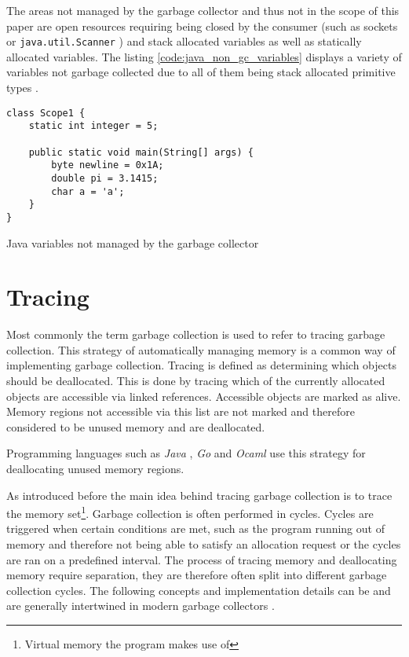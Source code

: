 The areas not managed by the garbage collector and thus not in the scope of
this paper are open resources requiring being closed by the consumer (such as
sockets or \texttt{java.util.Scanner} \cite[close]{java-util-scanner}) and
stack allocated variables as well as statically allocated variables. The
listing \autoref{code:java_non_gc_variables} displays a variety of variables
not garbage collected due to all of them being stack allocated primitive types
\cite[4.2. Primitive Types and Values]{java_language_spec_2023}.

\begin{listing}[H] 
    \begin{verbatim} 
class Scope1 {
    static int integer = 5;

    public static void main(String[] args) {
        byte newline = 0x1A;
        double pi = 3.1415;
        char a = 'a';
    }
}
    \end{verbatim}
    \caption{Java variables not managed by the garbage collector}
    \label{code:java_non_gc_variables}
\end{listing}

\section{Tracing}

Most commonly the term garbage collection is used to refer to tracing garbage
collection. This strategy of automatically managing memory is a common way of
implementing garbage collection. Tracing is defined as determining which
objects should be deallocated. This is done by tracing which of the currently
allocated objects are accessible via linked references. Accessible objects are
marked as alive. Memory regions not accessible via this list are not marked and
therefore considered to be unused memory and are deallocated. \cite[Garbage
Collection Background]{gc-hardware_2018}

Programming languages such as \textit{Java} \cite[2.2 Full GC
algorithm]{java_gc_comparison_2019}, \textit{Go} \cite[Tracing Garbage
Collection]{go_gcguide_2022} and \textit{Ocaml} \cite[Garbage Collection,
Reference Counting, and Explicit Allocation]{ocmal_gc_unknown} use this
strategy for deallocating unused memory regions.

As introduced before the main idea behind tracing garbage collection is to
trace the memory set\footnote{Virtual memory the program makes use of}. Garbage
collection is often performed in cycles. Cycles are triggered when certain
conditions are met, such as the program running out of memory and therefore not
being able to satisfy an allocation request or the cycles are ran on a
predefined interval. The process of tracing memory and deallocating memory
require separation, they are therefore often split into different garbage
collection cycles. The following concepts and implementation details can be and
are generally intertwined in modern garbage collectors \cite[The GC
cycle]{go_gcguide_2022} \cite{ocmal_gc_unknown}.


